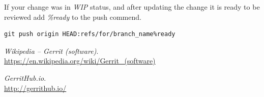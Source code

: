 \documentclass{article}
\begin{document}
If your change was in \textit{WIP} status, and after updating the change it is ready to be reviewed add \textit{\%ready} to the push commend.

\begin{lstlisting}
git push origin HEAD:refs/for/branch_name%ready
\end{lstlisting}


\newpage

\begin{thebibliography}{9}

\textit{Wikipedia -- Gerrit (software)}.\\ 
\url{https://en.wikipedia.org/wiki/Gerrit_(software)}
 
\textit{GerritHub.io}.\\ 
\url{http://gerrithub.io/}

\end{thebibliography}

\newpage

\begin{versionhistory}
\end{versionhistory}
\end{document}
